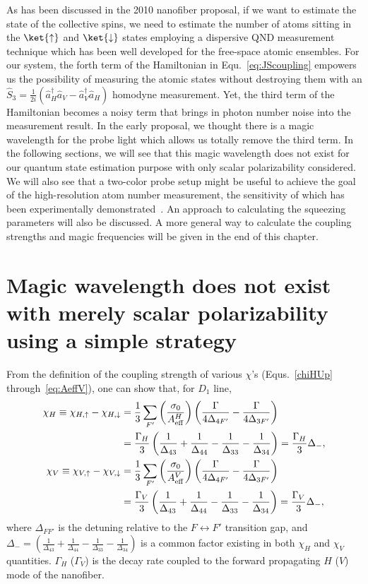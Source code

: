 As has been discussed in the 2010 nanofiber proposal, if we want to estimate the state of the collective 
spins, we need to estimate the number of atoms sitting in the $ \ket{\uparrow} $ and $ \ket{\downarrow} 
$ states employing a dispersive QND measurement technique which has been well developed for the 
free-space atomic ensembles. For our system, the forth term of the Hamiltonian in 
Equ.~\eqref{eq:JScoupling} empowers us the possibility of measuring the atomic states without 
destroying them with an $ \hat{S}_3=\frac{1}{2i}(\hat{a}_H^\dagger\hat{a}_V - 
\hat{a}_V^\dagger\hat{a}_H) $ homodyne measurement. Yet, the third term of the Hamiltonian becomes 
a noisy term that brings in photon number noise into the measurement result. In the early proposal, we 
thought there is a magic wavelength for the probe light which allows us totally remove the third term. 
In the following sections, we will see that this magic wavelength does not exist for our quantum state 
estimation purpose with only scalar polarizability considered. We will also see that a two-color probe 
setup might be useful to 
achieve the goal of the high-resolution atom number measurement, the sensitivity of which has been 
experimentally demonstrated~\cite{Beguin2014}. An approach to calculating the squeezing parameters 
will also be discussed. A more general way to calculate the coupling strengths and magic frequencies 
will be given in the end of this chapter.

\section{Magic wavelength does not exist with merely scalar polarizability using a simple strategy}
From the definition of the coupling strength of various $ \chi $'s (Equs.~\eqref{chiHUp} through~\eqref{eq:AeffV}), one can show that, for $ D_1 $ line, 
\begin{align}
\chi_H \equiv \chi_{H,\uparrow} - \chi_{H,\downarrow} &= \frac{1}{3}\sum_{F'} \left(\frac{\sigma_0}{A_{\rm eff}^H} \right) \left(\frac{\Gamma}{4\Delta_{4F'}} - \frac{\Gamma}{4\Delta_{3F'}} \right) \nonumber\\
&= \frac{\Gamma_H}{3} \left(\frac{1}{\Delta_{43}}+\frac{1}{\Delta_{44}} - \frac{1}{\Delta_{33}}-\frac{1}{\Delta_{34}} \right) = \frac{\Gamma_H}{3}\Delta_-,\label{eq:chiH}\\
\chi_V \equiv \chi_{V,\uparrow} - \chi_{V,\downarrow} &= \frac{1}{3}\sum_{F'} \left(\frac{\sigma_0}{A_{\rm eff}^V} \right) \left(\frac{\Gamma}{4\Delta_{4F'}} - \frac{\Gamma}{4\Delta_{3F'}} \right) \nonumber\\
&= \frac{\Gamma_V}{3} \left(\frac{1}{\Delta_{43}}+\frac{1}{\Delta_{44}} - \frac{1}{\Delta_{33}}-\frac{1}{\Delta_{34}} \right)=\frac{\Gamma_V}{3}\Delta_-,\label{eq:chiV}
\end{align}
where $ \Delta_{FF'} $ is the detuning relative to the $ F\leftrightarrow F' $ transition gap, and $ \Delta_- = \left(\frac{1}{\Delta_{43}}+\frac{1}{\Delta_{44}} - \frac{1}{\Delta_{33}}-\frac{1}{\Delta_{34}} \right) $ is a common factor existing in both $ \chi_H $ and $ \chi_V $ quantities. $ \Gamma_H $ ($ \Gamma_V $) is the decay rate coupled to the forward propagating $ H $ ($ V $) mode of the nanofiber. 

